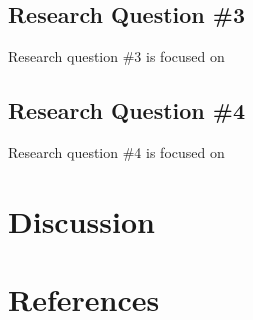 \documentclass[]{book}
\theoremstyle{definition}
\theoremstyle{definition}
\theoremstyle{definition}
\theoremstyle{remark}
\begin{document}
\section{Research Question \#3}\label{research-question-3}

Research question \#3 is focused on

\section{Research Question \#4}\label{research-question-4}

Research question \#4 is focused on

\chapter{Discussion}\label{discussion}

\chapter{References}\label{references}
\end{document}
